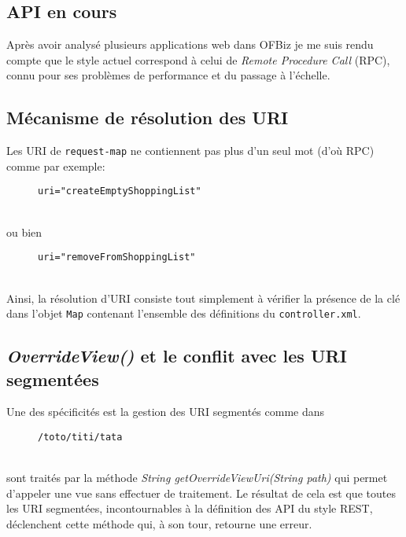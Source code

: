 \subsection{API en cours}
Après avoir analysé plusieurs applications web dans OFBiz je me suis rendu compte que le style actuel correspond à celui de \emph{Remote Procedure Call }(RPC), connu pour ses problèmes de performance et du passage à l'échelle. 

\subsection{Mécanisme de résolution des URI}
Les URI de \verb|request-map| ne contiennent pas plus d'un seul mot (d'où RPC) comme par exemple:
\begin{figure}[h!]
	\begin{lstlisting}[frame=leftline]
uri="createEmptyShoppingList"
	\end{lstlisting}
\end{figure}\\
ou bien \\
\begin{figure}[h!]
	\begin{lstlisting}[frame=leftline]
uri="removeFromShoppingList"
	\end{lstlisting}
\end{figure}\\
Ainsi, la résolution d'URI consiste  tout simplement  à vérifier la présence de la clé dans l'objet \verb|Map| contenant l'ensemble des définitions du \verb|controller.xml|.
    


\subsection{\textit{OverrideView()} et le conflit avec les URI segmentées}
Une des spécificités est la gestion des URI segmentés comme dans \\
\begin{figure}[h!]
	\begin{lstlisting}[frame=leftline]
/toto/titi/tata
	\end{lstlisting}
\end{figure}\\
 sont traités par la méthode \emph{String getOverrideViewUri(String path)} qui permet d'appeler une vue sans effectuer de traitement. Le résultat de cela est que toutes les URI segmentées, incontournables à la définition des API du style REST, déclenchent cette méthode qui, à son tour, retourne une erreur. 

